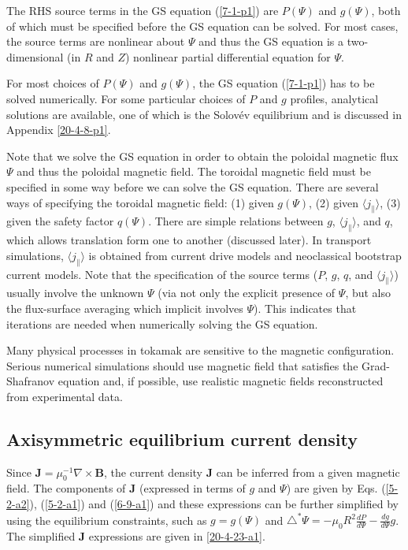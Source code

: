 \documentclass{llncs}
\begin{document}
The RHS source terms in the GS equation (\ref{7-1-p1}) are $P (\Psi)$ and $g
(\Psi)$, both of which must be specified before the GS equation can be solved.
For most cases, the source terms are nonlinear about $\Psi$ and thus the GS
equation is a two-dimensional (in $R$ and $Z$) nonlinear partial differential
equation for $\Psi$.

For most choices of $P (\Psi)$ and $g (\Psi)$, the GS equation (\ref{7-1-p1})
has to be solved numerically. For some particular choices of $P$ and $g$
profiles, analytical solutions are available, one of which is the Solov{\'e}v
equilibrium and is discussed in Appendix \ref{20-4-8-p1}.

Note that we solve the GS equation in order to obtain the poloidal magnetic
flux $\Psi$ and thus the poloidal magnetic field. The toroidal magnetic field
must be specified in some way before we can solve the GS equation. There are
several ways of specifying the toroidal magnetic field: (1) given $g (\Psi)$,
(2) given $\langle j_{\parallel} \rangle$, (3) given the safety factor $q
(\Psi)$. There are simple relations between $g$, $\langle j_{\parallel}
\rangle$, and $q$, which allows translation form one to another (discussed
later). In transport simulations, $\langle j_{\parallel} \rangle$ is obtained
from current drive models and neoclassical bootstrap current models. Note that
the specification of the source terms ($P$, $g$, $q$, and $\langle
j_{\parallel} \rangle$) usually involve the unknown $\Psi$ (via not only the
explicit presence of $\Psi$, but also the flux-surface averaging which
implicit involves $\Psi$). This indicates that iterations are needed when
numerically solving the GS equation.

Many physical processes in tokamak are sensitive to the magnetic
configuration. Serious numerical simulations should use magnetic field that
satisfies the Grad-Shafranov equation and, if possible, use realistic magnetic
fields reconstructed from experimental data.

\subsection{Axisymmetric equilibrium current density}

Since $\mathbf{J}= \mu_0^{- 1} \nabla \times \mathbf{B}$, the current density
$\mathbf{J}$ can be inferred from a given magnetic field. The components of
$\mathbf{J}$ (expressed in terms of $g$ and $\Psi$) are given by Eqs.
(\ref{5-2-a2}), (\ref{5-2-a1}) and (\ref{6-9-a1}) and these expressions can be
further simplified by using the equilibrium constraints, such as $g = g
(\Psi)$ and $\triangle^{\ast} \Psi = - \mu_0 R^2 \frac{d P}{d \Psi} - \frac{d
g}{d \Psi} g$. The simplified $\mathbf{J}$ expressions are given in
\ref{20-4-23-a1}.
\end{document}
